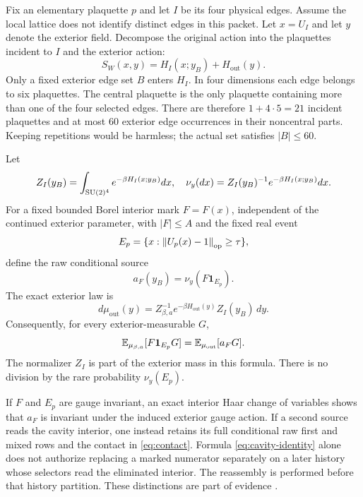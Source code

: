 Fix an elementary plaquette $p$ and let $I$ be its four physical edges. Assume the local lattice does not identify distinct edges in this packet. Let $x=U_I$ and let $y$ denote the exterior field. Decompose the original action into the plaquettes incident to $I$ and the exterior action:
\[
 S_W(x,y)=H_I(x;y_B)+H_{\mathrm{out}}(y).
\]
Only a fixed exterior edge set $B$ enters $H_I$. In four dimensions each edge belongs to six plaquettes. The central plaquette is the only plaquette containing more than one of the four selected edges. There are therefore $1+4\cdot5=21$ incident plaquettes and at most $60$ exterior edge occurrences in their noncentral parts. Keeping repetitions would be harmless; the actual set satisfies $|B|\le60$.

Let
\begin{equation}\label{eq:cavity-law}
 Z_I(y_B)=\int_{\mathrm{SU}(2)^4}e^{-\beta H_I(x;y_B)}dx,
 \quad
 \nu_y(dx)=Z_I(y_B)^{-1}e^{-\beta H_I(x;y_B)}dx.
\end{equation}
For a fixed bounded Borel interior mark $F=F(x)$, independent of the continued exterior parameter, with $|F|\le A$ and the fixed real event
\[
 E_p=\{x:\left\lVert U_p(x)-1\right\rVert_{\mathrm{op}}\ge\tau\},
\]
define the raw conditional source
\begin{equation}\label{eq:cavity-source}
 a_F(y_B)=\nu_y(F\mathbf1_{E_p}).
\end{equation}
The exact exterior law is
\begin{equation}\label{eq:exterior-law}
 d\mu_{\mathrm{out}}(y)=Z_{\beta,a}^{-1}
 e^{-\beta H_{\mathrm{out}}(y)}Z_I(y_B)\,dy.
\end{equation}
Consequently, for every exterior-measurable $G$,
\begin{equation}\label{eq:cavity-identity}
 \mathbb E_{\mu_{\beta,a}}[F\mathbf1_{E_p}G]
 =\mathbb E_{\mu_{\mathrm{out}}}[a_FG].
\end{equation}
The normalizer $Z_I$ is part of the exterior mass in this formula. There is no division by the rare probability $\nu_y(E_p)$.

If $F$ and $E_p$ are gauge invariant, an exact interior Haar change of variables shows that $a_F$ is invariant under the induced exterior gauge action. If a second source reads the cavity interior, one instead retains its full conditional raw first and mixed rows and the contact in \eqref{eq:contact}. Formula \eqref{eq:cavity-identity} alone does not authorize replacing a marked numerator separately on a later history whose selectors read the eliminated interior. The reassembly is performed before that history partition. These distinctions are part of evidence .

